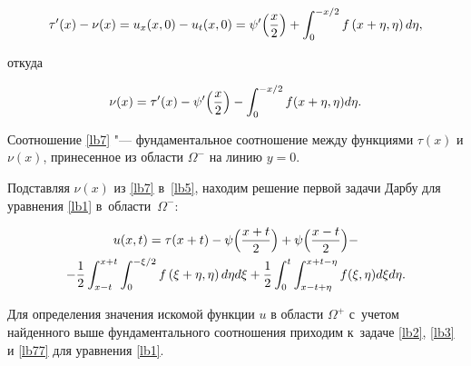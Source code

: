 \begin{equation}

\label{lb77}

\tau'(x)-\nu(x)=u_x (x, 0)-u_t (x, 0)=\psi'\Bigl(\frac{x}{2}\Bigr)+\int _{0}^{-x/2}f \left(x+\eta,\eta\right)d\eta,

\end{equation}

откуда

\begin{equation}

\label{lb7}

\nu(x)=\tau'(x)-\psi'\Bigl(\frac{x}{2}\Bigr)-\int _{0}^{-x/2}f (x+\eta,\eta)d\eta.

\end{equation}



Соотношение \eqref{lb7} "--- фундаментальное соотношение между функциями $\tau(x)$ и $\nu(x)$, принесенное из области $\Omega^{-}$ на линию $y=0$. 

Подставляя $\nu(x)$ из \eqref{lb7} в~\eqref{lb5}, находим решение первой задачи Дарбу для уравнения \eqref{lb1} в~области~$\Omega^{-}$:

\begin{multline}

u(x, t)=\tau(x+t)-\psi\Bigl(\frac{x+t}{2}\Bigr)+\psi\Bigl(\frac{x-t}{2}\Bigr)-

\\

\label{lb8}

-\frac{1}{2}\int _{x-t}^{x+t}\int _{0}^{-\xi/2}f \left(\xi+\eta,\eta\right)d\eta d\xi +\frac{1}{2} \int _{0}^{t}\int _{x-t+\eta}^{x+t-\eta} f (\xi,\eta) d\xi d\eta.

\end{multline}



Для определения значения искомой функции $u$ в области $\Omega^{+}$ с~учетом найденного  выше фундаментального соотношения приходим к~задаче \eqref{lb2}, \eqref{lb3} и \eqref{lb77} для уравнения \eqref{lb1}. 







\smallskip





